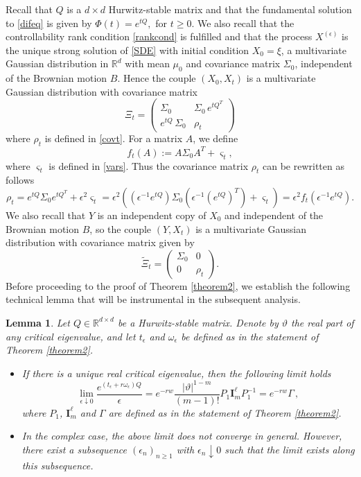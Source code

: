 \documentclass[12pt,thmsa]{article}
\newtheorem{lemma}{Lemma}
\begin{document}
Recall that  $Q$ is a $d \times d$ Hurwitz-stable matrix and that the fundamental solution to \eqref{difeq} is given by
$\Phi(t)=e^{ t Q},$ for  $t\ge 0.$
We also recall  that the controllability rank condition \eqref{rankcond} is fulfilled and that  the process $X^{(\epsilon)}$ is the unique strong solution of  \eqref{SDE} with initial condition $X_0= \xi$,  a multivariate Gaussian distribution in $\mathbb{R}^{d}$ with mean  $\mu_0$ and covariance matrix $\Sigma_0$,  independent of the Brownian motion $B$. Hence the couple $(X_0,X_t)$ is  a  multivariate Gaussian distribution with covariance  matrix
$$
\Xi_t=
\begin{pmatrix}
	\Sigma_0 & \Sigma_0\, e^{ t Q^{T} } \\ 
	e^{ t Q } \,\Sigma_0  & \rho_t 
\end{pmatrix}
$$
where $\rho_t$ is defined in \eqref{covt}.  For a matrix $A$, we  define 
\[
f_t(A):= A \Sigma_0 A^{T} + \varsigma_t ,
\] 
where $\varsigma_t$ is defined in \eqref{vars}.
Thus the covariance matrix $\rho_t$ can be rewritten as follows
$$ \rho_t=e^{tQ}\Sigma_0e^{tQ^T}+\epsilon^2 \varsigma_t=\epsilon^2\left( \left(\epsilon^{-1}e^{tQ}\right)\Sigma_0\left(\epsilon^{-1}\left(e^{tQ}\right)^T\right)+\varsigma_t\right)=\epsilon^2 f_t \left(\epsilon^{-1}e^{tQ}\right). $$
We also recall that  $Y$ is an independent  copy of  $X_0$  and independent of the Brownian motion $B$, so the couple $(Y,X_t)$ is a multivariate Gaussian distribution with covariance  matrix given by
$$
\widetilde{\Xi}_t=
\begin{pmatrix}
	\Sigma_0 & 0 \\ 
	0  & \rho_t 
\end{pmatrix}.
$$
Before proceeding to the proof of Theorem \ref{theorem2}, we establish the following technical lemma that will be instrumental in the subsequent analysis.
\begin{lemma}\label{Jordan} Let $Q\in\mathbb{R}^{d\times d}$ be a Hurwitz-stable matrix.  Denote by $\vartheta$  the real part of any critical eigenvalue, and let $t_\epsilon$  and  $\omega_\epsilon$ be defined as in the statement of Theorem \ref{theorem2}. \begin{itemize}
		\item[i)] If there is a unique real critical eigenvalue, then the following limit holds
		\[
		\lim_{\epsilon \downarrow 0} \frac{e^{(t_{\epsilon}+r\omega_\epsilon) Q}}{\epsilon}=e^{-rw}\frac{|\vartheta|^{1-m}}{(m-1)!} P_1\mathbf{I}^{\ell}_mP_1^{-1}=e^{-rw}\Gamma\,,
		\]
		where $P_1$, $\mathbf{I}^{\ell}_m$ and $\Gamma$ are defined as in the statement of Theorem \ref{theorem2}.
		\item[ii)] In the complex case, the above  limit does not converge in general. However, there exist a subsequence $(\epsilon_n)_{n\ge 1}$ with $\epsilon_n\downarrow 0$ such that the limit  exists along this subsequence.
	\end{itemize}
\end{lemma}
\end{document}
